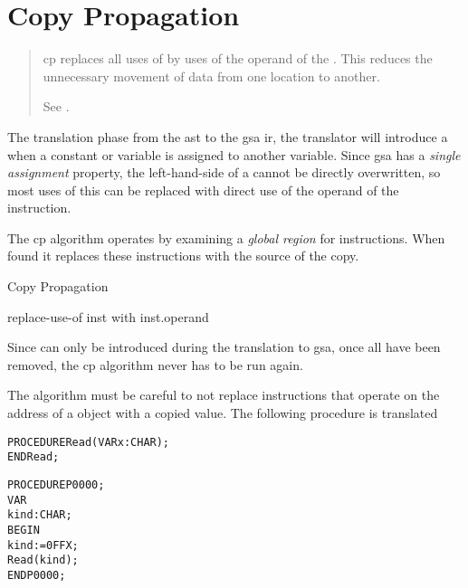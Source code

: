 \chapter{Copy Propagation}

\begin{quote}
  \ac{cp} replaces all uses of  by uses of the operand
  of the .  This reduces the unnecessary movement of
  data from one location to another.

  See .
\end{quote}

The translation phase from the \ac{ast} to the \ac{gsa} \ac{ir}, the
translator will introduce a  when a constant or variable
is assigned to another variable.  Since \ac{gsa} has a \emph{single
  assignment} property, the left-hand-side of a  cannot
be directly overwritten, so most uses of this  can be
replaced with direct use of the operand of the instruction.

The \ac{cp} algorithm operates by examining a \emph{global region} for
 instructions.  When found it replaces these
instructions with the source of the copy.

\begin{algorithm}[h!]
  \caption{Copy Propagation}
  \begin{algorithmic}[1]

    \STATE
              \STATE replace-use-of inst with inst.operand
            \ENDIF
          \ENDFOR
        \ENDIF
      \ENDFOR
    \ENDFOR
  \end{algorithmic}
\end{algorithm}

Since  can only be introduced during the translation to
\ac{gsa}, once all have been removed, the \ac{cp} algorithm never has
to be run again.

The algorithm must be careful to not replace instructions that operate
on the address of a object with a copied value.  The following
procedure is translated

\begin{alltt}
PROCEDURE Read(VAR x : CHAR);
END Read;

PROCEDURE P0000;
  VAR
    kind : CHAR;
BEGIN
  kind := 0FFX;
  Read(kind);
END P0000;
\end{alltt}

